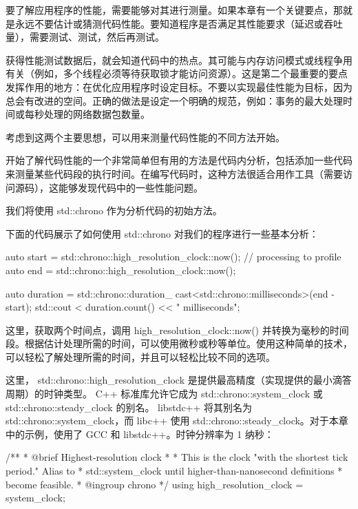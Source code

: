 

要了解应用程序的性能，需要能够对其进行测量。如果本章有一个关键要点，那就是永远不要估计或猜测代码性能。要知道程序是否满足其性能要求（延迟或吞吐量），需要测试、测试，然后再测试。

获得性能测试数据后，就会知道代码中的热点。其可能与内存访问模式或线程争用有关（例如，多个线程必须等待获取锁才能访问资源）。这是第二个最重要的要点发挥作用的地方：在优化应用程序时设定目标。不要以实现最佳性能为目标，因为总会有改进的空间。正确的做法是设定一个明确的规范，例如：事务的最大处理时间或每秒处理的网络数据包数量。

考虑到这两个主要思想，可以用来测量代码性能的不同方法开始。


开始了解代码性能的一个非常简单但有用的方法是代码内分析，包括添加一些代码来测量某些代码段的执行时间。在编写代码时，这种方法很适合用作工具（需要访问源码），这能够发现代码中的一些性能问题。

我们将使用 std::chrono 作为分析代码的初始方法。

下面的代码展示了如何使用 std::chrono 对我们的程序进行一些基本分析：

\begin{cpp}
auto start = std::chrono::high_resolution_clock::now();
// processing to profile
auto end = std::chrono::high_resolution_clock::now();

auto duration = std::chrono::duration_
cast<std::chrono::milliseconds>(end - start);
std::cout < duration.count() << " milliseconds\n";
\end{cpp}

这里，获取两个时间点，调用 high\_resolution\_clock::now() 并转换为毫秒的时间段。根据估计处理所需的时间，可以使用微秒或秒等单位。使用这种简单的技术，可以轻松了解处理所需的时间，并且可以轻松比较不同的选项。

这里， std::chrono::high\_resolution\_clock 是提供最高精度（实现提供的最小滴答周期）的时钟类型。 C++ 标准库允许它成为 std::chrono::system\_clock 或 std::chrono::steady\_clock 的别名。 libstdc++ 将其别名为 std::chrono::system\_clock，而 libc++ 使用 std::chrono::steady\_clock。对于本章中的示例，使用了 GCC 和 libstdc++。时钟分辨率为 1 纳秒：

\begin{cpp}
/**
 * @brief Highest-resolution clock
 *
 * This is the clock "with the shortest tick period." Alias to
 * std::system_clock until higher-than-nanosecond definitions
 * become feasible.
 * @ingroup chrono
*/
using high_resolution_clock = system_clock;
\end{cpp}

